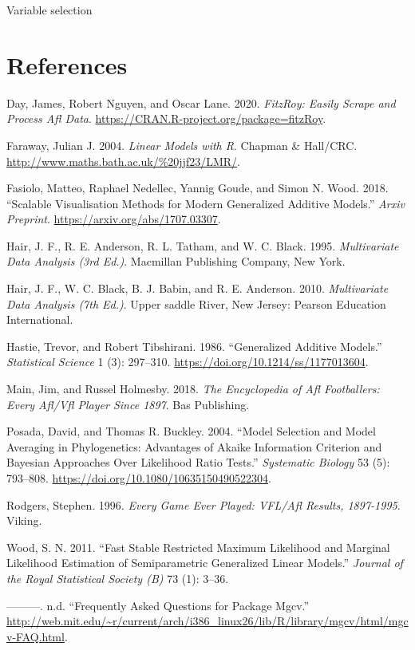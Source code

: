 \documentclass{article}
\begin{document}
Variable selection

\hypertarget{references}{%
\section*{References}\label{references}}

\hypertarget{refs}{}
\leavevmode\hypertarget{ref-fitzRoy}{}%
Day, James, Robert Nguyen, and Oscar Lane. 2020. \emph{FitzRoy: Easily
Scrape and Process Afl Data}.
\url{https://CRAN.R-project.org/package=fitzRoy}.

\leavevmode\hypertarget{ref-R:Faraway:2004}{}%
Faraway, Julian J. 2004. \emph{Linear Models with R}. Chapman \&
Hall/CRC. \url{http://www.maths.bath.ac.uk/\%20jjf23/LMR/}.

\leavevmode\hypertarget{ref-mgcViz}{}%
Fasiolo, Matteo, Raphael Nedellec, Yannig Goude, and Simon N. Wood.
2018. ``Scalable Visualisation Methods for Modern Generalized Additive
Models.'' \emph{Arxiv Preprint}. \url{https://arxiv.org/abs/1707.03307}.

\leavevmode\hypertarget{ref-multi2}{}%
Hair, J. F., R. E. Anderson, R. L. Tatham, and W. C. Black. 1995.
\emph{Multivariate Data Analysis (3rd Ed.)}. Macmillan Publishing
Company, New York.

\leavevmode\hypertarget{ref-multi1}{}%
Hair, J. F., W. C. Black, B. J. Babin, and R. E. Anderson. 2010.
\emph{Multivariate Data Analysis (7th Ed.)}. Upper saddle River, New
Jersey: Pearson Education International.

\leavevmode\hypertarget{ref-10.1214ux2fssux2f1177013604}{}%
Hastie, Trevor, and Robert Tibshirani. 1986. ``Generalized Additive
Models.'' \emph{Statistical Science} 1 (3): 297--310.
\url{https://doi.org/10.1214/ss/1177013604}.

\leavevmode\hypertarget{ref-everyone}{}%
Main, Jim, and Russel Holmesby. 2018. \emph{The Encyclopedia of Afl
Footballers: Every Afl/Vfl Player Since 1897}. Bas Publishing.

\leavevmode\hypertarget{ref-10.1080ux2f10635150490522304}{}%
Posada, David, and Thomas R. Buckley. 2004. ``Model Selection and Model
Averaging in Phylogenetics: Advantages of Akaike Information Criterion
and Bayesian Approaches Over Likelihood Ratio Tests.'' \emph{Systematic
Biology} 53 (5): 793--808.
\url{https://doi.org/10.1080/10635150490522304}.

\leavevmode\hypertarget{ref-everygame}{}%
Rodgers, Stephen. 1996. \emph{Every Game Ever Played: VFL/Afl Results,
1897-1995}. Viking.

\leavevmode\hypertarget{ref-mgcv}{}%
Wood, S. N. 2011. ``Fast Stable Restricted Maximum Likelihood and
Marginal Likelihood Estimation of Semiparametric Generalized Linear
Models.'' \emph{Journal of the Royal Statistical Society (B)} 73 (1):
3--36.

\leavevmode\hypertarget{ref-wood}{}%
---------. n.d. ``Frequently Asked Questions for Package Mgcv.''
\url{http://web.mit.edu/~r/current/arch/i386_linux26/lib/R/library/mgcv/html/mgcv-FAQ.html}.



\end{document}
